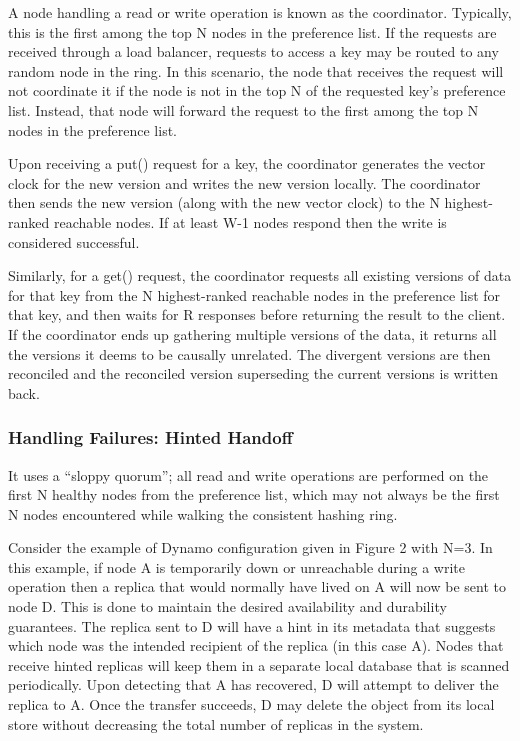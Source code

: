 A node handling a read or write operation is known as the
coordinator. Typically, this is the first among the top N nodes in
the preference list. If the requests are received through a load
balancer, requests to access a key may be routed to any random
node in the ring. In this scenario, the node that receives the
request will not coordinate it if the node is not in the top N of the
requested key’s preference list. Instead, that node will forward the
request to the first among the top N nodes in the preference list. 

Upon receiving a put() request for a key, the coordinator generates
the vector clock for the new version and writes the new version
locally. The coordinator then sends the new version (along with the new vector clock) to the N highest-ranked reachable nodes. If
at least W-1 nodes respond then the write is considered
successful. 

Similarly, for a get() request, the coordinator requests all existing
versions of data for that key from the N highest-ranked reachable
nodes in the preference list for that key, and then waits for R
responses before returning the result to the client. If the
coordinator ends up gathering multiple versions of the data, it
returns all the versions it deems to be causally unrelated. The
divergent versions are then reconciled and the reconciled version
superseding the current versions is written back. 


\subsubsection{Handling Failures: Hinted Handoff}

It uses a “sloppy quorum”; all read and
write operations are performed on the first N healthy nodes from
the preference list, which may not always be the first N nodes
encountered while walking the consistent hashing ring. 

Consider the example of Dynamo configuration given in Figure 2
with N=3. In this example, if node A is temporarily down or
unreachable during a write operation then a replica that would
normally have lived on A will now be sent to node D. This is done
to maintain the desired availability and durability guarantees. The
replica sent to D will have a hint in its metadata that suggests
which node was the intended recipient of the replica (in this case
A). Nodes that receive hinted replicas will keep them in a
separate local database that is scanned periodically. Upon
detecting that A has recovered, D will attempt to deliver the
replica to A. Once the transfer succeeds, D may delete the object
from its local store without decreasing the total number of replicas
in the system. 

